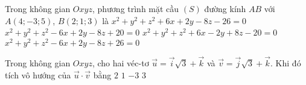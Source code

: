 \begin{ex}%
Trong không gian $Oxyz$, phương trình mặt cầu $\left(S\right)$ đường kính $AB$ với $A\left(4; -3; 5\right)$, $B\left(2; 1; 3\right)$ là
	\choice
	{$x^2 + y^2 + z^2 + 6x + 2y - 8z - 26 = 0$}
	{\True $x^2 + y^2 + z^2 - 6x + 2y - 8z + 20 = 0$}
	{$x^2 + y^2 + z^2 + 6x -  2y + 8z - 20 = 0$}
	{$x^2 + y^2 + z^2 - 6x + 2y - 8z +  26 = 0$}
\end{ex}

\begin{ex}%
Trong không gian $Oxyz$, cho hai véc-tơ $\overrightarrow{u} = \overrightarrow{i}\sqrt{3}+ \overrightarrow{k}$ và $\overrightarrow{v} = \overrightarrow{j}\sqrt{3}+ \overrightarrow{k}$. Khi đó tích vô hướng của $\overrightarrow{u}\cdot \overrightarrow{v}$ bằng  
	\choice
	{$2$}
	{\True $1$}
	{$- 3$}
	{$3$}
\end{ex}

